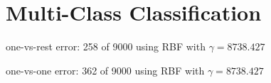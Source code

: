 
\section*{Multi-Class Classification} 
one-vs-rest error: 258 of 9000
using RBF with $\gamma = 8738.427$

one-vs-one error: 362 of 9000
using RBF with $\gamma = 8738.427$